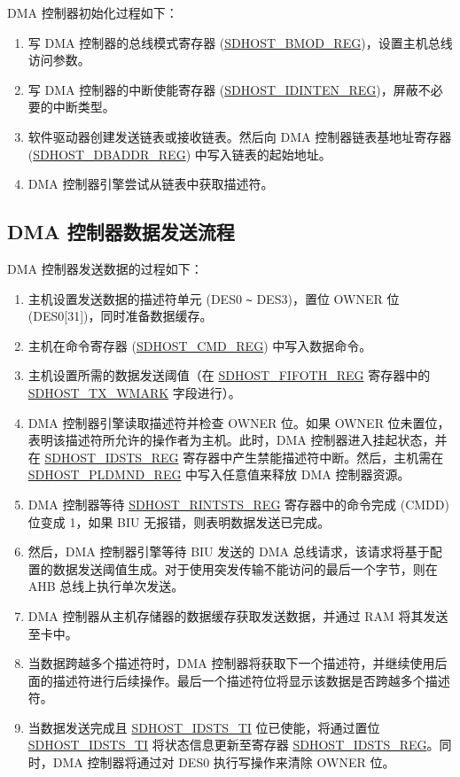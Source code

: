 \documentclass[main\_\_CN.tex]{subfiles}
\begin{document}
DMA 控制器初始化过程如下：

\begin{enumerate}
\item 写 DMA 控制器的总线模式寄存器 (\hyperref[regdesc:SDHOSTBMODREG]{SDHOST\_BMOD\_REG})，设置主机总线访问参数。
\item 写 DMA 控制器的中断使能寄存器 (\hyperref[regdesc:SDHOSTIDINTENREG]{SDHOST\_IDINTEN\_REG})，屏蔽不必要的中断类型。
\item 软件驱动器创建发送链表或接收链表。然后向 DMA 控制器链表基地址寄存器 (\hyperref[fielddesc:SDHOSTDBADDRREG]{\hyperref[regdesc:SDHOSTDBADDRREG]{SDHOST\_DBADDR\_REG}}) 中写入链表的起始地址。
\item DMA 控制器引擎尝试从链表中获取描述符。
\end{enumerate}

\subsection{DMA 控制器数据发送流程}\label{sec:sdhost-dma-tx}

DMA 控制器发送数据的过程如下：

\begin{enumerate}
\item 主机设置发送数据的描述符单元 (DES0 \verb+~+ DES3)，置位 OWNER 位 (DES0[31])，同时准备数据缓存。
\item 主机在命令寄存器 (\hyperref[regdesc:SDHOSTCMDREG]{SDHOST\_CMD\_REG}) 中写入数据命令。
\item 主机设置所需的数据发送阈值（在 \hyperref[regdesc:SDHOSTFIFOTHREG]{SDHOST\_FIFOTH\_REG} 寄存器中的 \hyperref[fielddesc:SDHOSTTXWMARK]{SDHOST\_TX\_WMARK} 字段进行）。
\item DMA 控制器引擎读取描述符并检查 OWNER 位。如果 OWNER 位未置位，表明该描述符所允许的操作者为主机。此时，DMA 控制器进入挂起状态，并在 \hyperref[regdesc:SDHOSTIDSTSREG]{SDHOST\_IDSTS\_REG} 寄存器中产生禁能描述符中断。然后，主机需在 \hyperref[regdesc:SDHOSTPLDMNDREG]{SDHOST\_PLDMND\_REG} 中写入任意值来释放 DMA 控制器资源。
\item DMA 控制器等待 \hyperref[regdesc:SDHOSTRINTSTSREG]{SDHOST\_RINTSTS\_REG} 寄存器中的命令完成 (CMDD) 位变成 1，如果 BIU 无报错，则表明数据发送已完成。
\item 然后，DMA 控制器引擎等待 BIU 发送的 DMA 总线请求，该请求将基于配置的数据发送阈值生成。对于使用突发传输不能访问的最后一个字节，则在 AHB 总线上执行单次发送。
\item DMA 控制器从主机存储器的数据缓存获取发送数据，并通过 RAM 将其发送至卡中。
\item 当数据跨越多个描述符时，DMA 控制器将获取下一个描述符，并继续使用后面的描述符进行后续操作。最后一个描述符位将显示该数据是否跨越多个描述符。
\item 当数据发送完成且 \hyperref[fielddesc:SDHOSTIDSTSTI]{SDHOST\_IDSTS\_TI} 位已使能，将通过置位 \hyperref[fielddesc:SDHOSTIDSTSTI]{SDHOST\_IDSTS\_TI} 将状态信息更新至寄存器 \hyperref[regdesc:SDHOSTIDSTSREG]{SDHOST\_IDSTS\_REG}。同时，DMA 控制器将通过对 DES0 执行写操作来清除 OWNER 位。
\end{enumerate}
\end{document}
